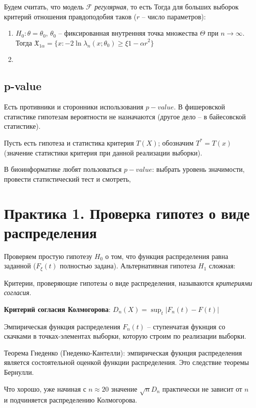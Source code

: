 \documentclass[main.tex]{subfiles}
\begin{document}
Будем считать, что модель $ \mathcal{F} $ \emph{регулярная}, то есть %
Тогда для больших выборок критерий отношения правдоподобия таков ($ r $ -- число параметров):
\begin{enumerate}
	\item $ H_0 : \theta=\theta_0 $, $ \theta_0 $ -- фиксированная внутренняя точка множества $ \Theta $ при $ n \to \infty $. Тогда $ \mathfrak{X}_{1 \alpha} = \{x: - 2 \ln \lambda_n(x;\theta_0) \ge \xi{1 - \alpha r}^2\} $
	\item %
\end{enumerate}

\subsection{p-value}

Есть противники и сторонники использования $ p-value $. В фишеровской статистике гипотезам вероятности не назначаются (другое дело -- в байесовской статистике).

Пусть есть гипотеза и статистика критерия $ T(X)$; обозначим $ T^* = T(x) $ (значение статистики критерия при данной реализации выборки).


В биоинформатике любят пользоваться $ p-value $: выбрать уровень значимости, провести статистический тест и смотреть, 

\section{Практика 1. Проверка гипотез о виде распределения}

Проверяем простую гипотезу $H_0$ о том, что функция распределения равна заданной ($ F_\xi(t) $ полностью задана).
Альтернативная гипотеза $ H_1 $ сложная: $  $

Критерии, проверяющие гипотезы о виде распределения, называются \emph{критериями согласия}.

\textbf{Критерий согласия Колмогорова}: $ D_n(X) = \sup_t |F_n(t) - F(t)| $

Эмпирическая функция распределения $ F_n(t) $ -- ступенчатая фукнция со скачками в точках-элементах выборки, которую строим по реализации выборки.

Теорема Гнеденко (Гнеденко-Кантелли): эмпирическая фукнция распределения является состоятельной оценкой функции распределения.
Это следствие теоремы Бернулли.

Что хорошо, уже начиная с $ n \approx 20 $ значение $ \sqrt{n} D_n $ практически не зависит от $ n $ и подчиняется распределению Колмогорова.
\end{document}
